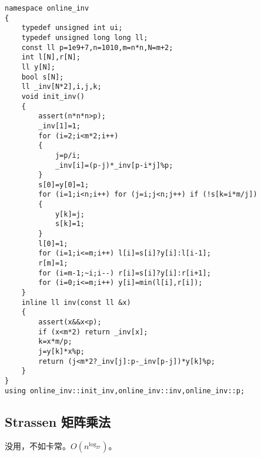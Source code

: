 \documentclass[12pt]{ctexart}
\begin{document}
\begin{lstlisting}
namespace online_inv
{
	typedef unsigned int ui;
	typedef unsigned long long ll;
	const ll p=1e9+7,n=1010,m=n*n,N=m+2;
	int l[N],r[N];
	ll y[N];
	bool s[N];
	ll _inv[N*2],i,j,k;
	void init_inv()
	{
		assert(n*n*n>p);
		_inv[1]=1;
		for (i=2;i<m*2;i++)
		{
			j=p/i;
			_inv[i]=(p-j)*_inv[p-i*j]%p;
		}
		s[0]=y[0]=1;
		for (i=1;i<n;i++) for (j=i;j<n;j++) if (!s[k=i*m/j])
		{
			y[k]=j;
			s[k]=1;
		}
		l[0]=1;
		for (i=1;i<=m;i++) l[i]=s[i]?y[i]:l[i-1];
		r[m]=1;
		for (i=m-1;~i;i--) r[i]=s[i]?y[i]:r[i+1];
		for (i=0;i<=m;i++) y[i]=min(l[i],r[i]);
	}
	inline ll inv(const ll &x)
	{
		assert(x&&x<p);
		if (x<m*2) return _inv[x];
		k=x*m/p;
		j=y[k]*x%p;
		return (j<m*2?_inv[j]:p-_inv[p-j])*y[k]%p;
	}
}
using online_inv::init_inv,online_inv::inv,online_inv::p;
\end{lstlisting}

\subsection{Strassen 矩阵乘法}

没用，不如卡常。$O(n^{\log_27})$。
\end{document}
